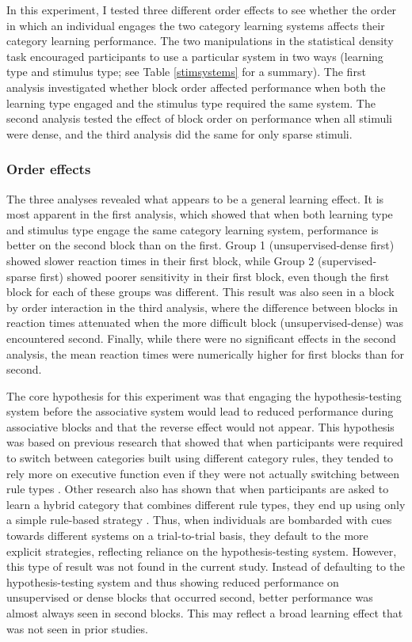 \documentclass[../dissertation.tex]{subfiles}
\begin{document}
	In this experiment, I tested three different order effects to see whether the order in which an individual engages the two category learning systems affects their category learning performance. The two manipulations in the statistical density task encouraged participants to use a particular system in two ways (learning type and stimulus type; see Table \ref{stimsystems} for a summary). The first analysis investigated whether block order affected performance when both the learning type engaged and the stimulus type required the same system. The second analysis tested the effect of block order on performance when all stimuli were dense, and the third analysis did the same for only sparse stimuli. \par
	
\subsubsection{Order effects}
	The three analyses revealed what appears to be a general learning effect. It is most apparent in the first analysis, which showed that when both learning type and stimulus type engage the same category learning system, performance is better on the second block than on the first. Group 1 (unsupervised-dense first) showed slower reaction times in their first block, while Group 2 (supervised-sparse first) showed poorer sensitivity in their first block, even though the first block for each of these groups was different. This result was also seen in a block by order interaction in the third analysis, where the difference between blocks in reaction times attenuated when the more difficult block (unsupervised-dense) was encountered second. Finally, while there were no significant effects in the second analysis, the mean reaction times were numerically higher for first blocks than for second. \par
	The core hypothesis for this experiment was that engaging the hypothesis-testing system before the associative system would lead to reduced performance during associative blocks and that the reverse effect would not appear. This hypothesis was based on previous research that showed that when participants were required to switch between categories built using different category rules, they tended to rely more on executive function even if they were not actually switching between rule types \citep{Erickson2008}. Other research also has shown that when participants are asked to learn a hybrid category that combines different rule types, they end up using only a simple rule-based strategy \citep{Ashby2010}. Thus, when individuals are bombarded with cues towards different systems on a trial-to-trial basis, they default to the more explicit strategies, reflecting reliance on the hypothesis-testing system. However, this type of result was not found in the current study. Instead of defaulting to the hypothesis-testing system and thus showing reduced performance on unsupervised or dense blocks that occurred second, better performance was almost always seen in second blocks. This may reflect a broad learning effect that was not seen in prior studies. \par
\end{document}
